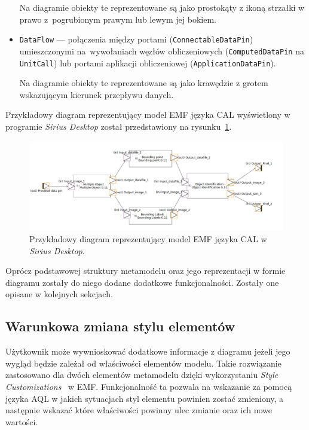 \begin{itemize}
	      Na diagramie obiekty te reprezentowane są jako prostokąty z ikoną strzałki w prawo z~pogrubionym prawym lub lewym jej bokiem.

	\item \texttt{DataFlow} --- połączenia między portami
	      (\texttt{ConnectableDataPin}) umieszczonymi na~wywołaniach węzłów
	      obliczeniowych (\texttt{ComputedDataPin} na \texttt{UnitCall}) lub portami aplikacji obliczeniowej (\texttt{ApplicationDataPin}).

	      Na diagramie obiekty te reprezentowane są jako krawędzie z grotem wskazującym kierunek przepływu danych.
\end{itemize}

Przykładowy diagram reprezentujący model EMF języka CAL wyświetlony w programie
\emph{Sirius Desktop} został przedstawiony na
rysunku~\ref{rys:sirius-desktop-cal-example-model}.

\begin{figure}[!ht]
	\centering

	\includegraphics[width=0.95\linewidth]{./images/sirius-desktop-cal-example-model.png}
	\caption{Przykładowy diagram reprezentujący model EMF języka CAL w
		\emph{Sirius Desktop}.}\label{rys:sirius-desktop-cal-example-model}
\end{figure}

Oprócz podstawowej struktury metamodelu oraz jego reprezentacji w formie
diagramu zostały do niego dodane dodatkowe funkcjonalności. Zostały one opisane
w kolejnych sekcjach.

\subsection{Warunkowa zmiana stylu elementów}

Użytkownik może wywnioskować dodatkowe informacje z diagramu jeżeli jego wygląd
będzie zależał od właściwości elementów modelu. Takie rozwiązanie zastosowano
dla dwóch elementów metamodelu dzięki wykorzystaniu \emph{Style
	Customizations}~\cite{sirius-desktop-documentation-style-customizations}
w \gls{EMF}.
Funkcjonalność ta pozwala na wskazanie za pomocą języka \gls{AQL} w jakich
sytuacjach styl elementu powinien zostać zmieniony, a następnie wskazać które
właściwości powinny ulec zmianie oraz ich nowe wartości.

